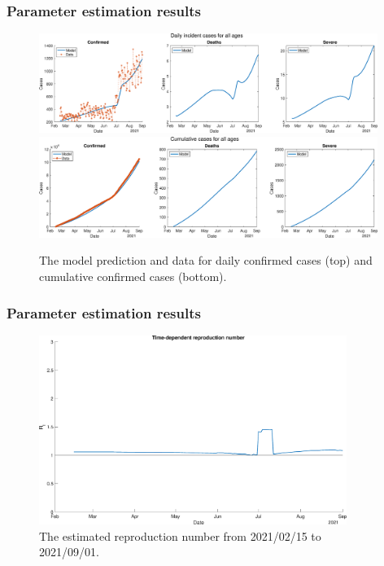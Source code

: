 \documentclass[aspectratio=169, 9pt, xcolor=dvipsnames]{beamer}
\begin{document}
	\begin{frame}\frametitle{Parameter estimation results}
	    \begin{figure}
	    	\centering
	    	\includegraphics[width=11cm]{../results/estimate_sd_1st_2_2nd_2/daily_all_age.eps}
	    	\includegraphics[width=11cm]{../results/estimate_sd_1st_2_2nd_2/cumul_all_age.eps}
	    	\caption{The model prediction and data for daily confirmed cases (top) and cumulative confirmed cases (bottom).}
	    \end{figure}
	\end{frame}

	\begin{frame}\frametitle{Parameter estimation results}
	    \begin{figure}
	    	\centering
	    	\includegraphics[width=10cm]{../results/estimate_sd_1st_2_2nd_2/rep_num.eps}
	    	\caption{The estimated reproduction number from 2021/02/15 to 2021/09/01.}
	    \end{figure}
	\end{frame}
\end{document}
